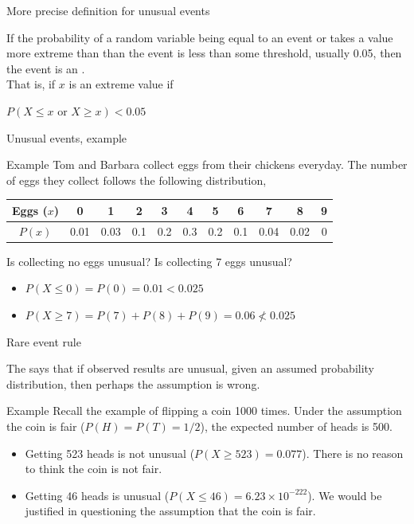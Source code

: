 \documentclass[xcolor=table, handout]{beamer}
\begin{document}
\begin{frame}{More precise definition for unusual events}
\begin{block}{}
If the probability of a random variable being equal to an event or takes a value more extreme than than the event is less than some threshold, usually 0.05, then the event is an .\\
\medskip
\pause
That is, if $x$ is an extreme value if\\\medskip
{\centering $P(X \le x \text{ or } X \ge x) < 0.05$ \par}
\pause{}
\pause{}
\end{block}
\end{frame}

\begin{frame}{Unusual events, example}
\begin{exampleblock}{Example}
Tom and Barbara collect eggs from their chickens everyday. The number of eggs they collect follows the following distribution,\\
\smallskip
{\centering
\begin{tabular}{c|cccccccccc}
Eggs ($x$) & 0 & 1 & 2 & 3 & 4 & 5 & 6 & 7 & 8 & 9 \\
\hline
$P(x)$ & 0.01 & 0.03 & 0.1 & 0.2 & 0.3 & 0.2 & 0.1 & 0.04 & 0.02 & 0
\end{tabular}\par
}
\medskip
Is collecting no eggs unusual? Is collecting 7 eggs unusual?
\begin{itemize}
\pause\item $P(X\le 0) = P(0)  = 0.01  < 0.025$
\pause\item $P(X \ge 7) = P(7) + P(8) + P(9) = 0.06 \not < 0.025$
\end{itemize}
\end{exampleblock}
\end{frame}

\begin{frame}{Rare event rule}
\begin{block}{}
The  says that if observed results are unusual, given an assumed probability distribution, then perhaps the assumption is wrong.
\end{block}
\pause
\begin{exampleblock}{Example}
Recall the example of flipping a coin 1000 times. Under the assumption the coin is fair ($P(H) = P(T) = 1/2$), the expected number of heads is 500.
\begin{itemize}
\pause\item Getting 523 heads is not unusual ($P(X \ge 523) = 0.077$). There is no reason to think the coin is not fair.
\pause\item Getting 46 heads is unusual ($P(X \le 46) = 6.23 \times 10^{-222}$). We would be justified in questioning the assumption that the coin is fair.
\end{itemize}
\end{exampleblock}
\end{frame}
\end{document}
